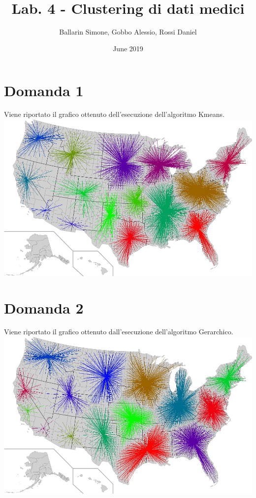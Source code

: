 \documentclass{article}
\title{Lab. 4 - Clustering di dati medici}
\author{Ballarin Simone, Gobbo Alessio, Rossi Daniel}
\date{June 2019}
\begin{document}
\maketitle

\section*{Domanda 1}
Viene riportato il grafico ottenuto dell'esecuzione dell'algoritmo Kmeans.\\
\includegraphics[width=1.0\linewidth, valign=t]{figures/Domanda1}

\section*{Domanda 2}
Viene riportato il grafico ottenuto dall'esecuzione dell'algoritmo Gerarchico.\\
\includegraphics[width=1.0\linewidth, valign=t]{figures/Domanda2}
\end{document}
